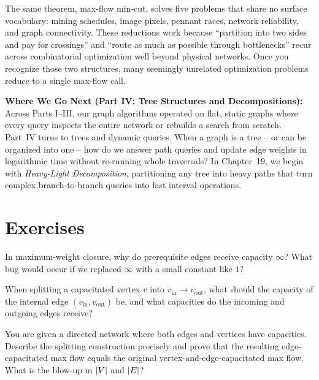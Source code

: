 \begin{aestheticbox}
The same theorem, max-flow min-cut, solves five problems that share no surface vocabulary: mining schedules, image pixels, pennant races, network reliability, and graph connectivity. These reductions work because ``partition into two sides and pay for crossings'' and ``route as much as possible through bottlenecks'' recur across combinatorial optimization well beyond physical networks. Once you recognize those two structures, many seemingly unrelated optimization problems reduce to a single max-flow call.

\textbf{Where We Go Next (Part IV: Tree Structures and Decompositions):} Across Parts I--III, our graph algorithms operated on flat, static graphs where every query inspects the entire network or rebuilds a search from scratch. Part~IV turns to trees and dynamic queries. When a graph is a tree -- or can be organized into one -- how do we answer path queries and update edge weights in logarithmic time without re-running whole traversals? In Chapter~19, we begin with \emph{Heavy-Light Decomposition}, partitioning any tree into heavy paths that turn complex branch-to-branch queries into fast interval operations.
\end{aestheticbox}

\section{Exercises}
\label{ch18:exercises}

\begin{exercise}
In maximum-weight closure, why do prerequisite edges receive capacity $\infty$? What bug would occur if we replaced $\infty$ with a small constant like $1$?
\end{exercise}

\begin{exercise}
When splitting a capacitated vertex $v$ into $v_{\text{in}} \to v_{\text{out}}$, what should the capacity of the internal edge $(v_{\text{in}}, v_{\text{out}})$ be, and what capacities do the incoming and outgoing edges receive?
\end{exercise}

\begin{exercise}
\label{ch18:ex-vertexcap}
You are given a directed network where both edges and vertices have capacities. Describe the splitting construction precisely and prove that the resulting edge-capacitated max flow equals the original vertex-and-edge-capacitated max flow. What is the blow-up in $\lvert V\rvert$ and $\lvert E\rvert$?
\end{exercise}


